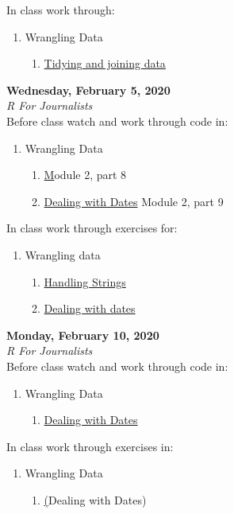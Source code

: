 \documentclass{article}
\begin{document}
\bigskip
In class work through:
\begin{enumerate}
\item Wrangling Data 
\begin{enumerate}
\item \href{http://code.r-journalism.com/chapter-3/#section-tidying-and-joining-data}{Tidying and joining data}
\end{enumerate}
\end{enumerate}
\bigskip
\textbf{Wednesday, February 5, 2020\\}
\emph{R For Journalists}\\
Before class watch and work through code in:
\begin{enumerate}
\item Wrangling Data
\begin{enumerate}
\item \href{http://learn.r-journalism.com/en/wrangling/strings/strings/} Module 2, part 8
\item \href{http://learn.r-journalism.com/en/wrangling/dates/dates/}{Dealing with Dates} Module 2, part 9
\end{enumerate}
\end{enumerate}
\bigskip
In class work through exercises for:
\begin{enumerate}
\item Wrangling data
\begin{enumerate}
\item \href{http://code.r-journalism.com/chapter-3/#section-handling-strings}{Handling Strings}
\item \href{http://code.r-journalism.com/chapter-3/#section-dealing-with-dates}{Dealing with dates}
\end{enumerate}
\end{enumerate}
\bigskip
\textbf{Monday, February 10, 2020\\}
\emph{R For Journalists}\\
Before class watch and work through code in:
\begin{enumerate}
\item Wrangling Data
\begin{enumerate}
\item \href{https://youtu.be/yt9x6PNYvlw}{Dealing with Dates}
\end{enumerate}

\end{enumerate}
\bigskip
In class work through exercises in:
\begin{enumerate}
\item Wrangling Data
\begin{enumerate}
\item \href{http://code.r-journalism.com/chapter-3/#section-dealing-with-dates}(Dealing with Dates)
\end{enumerate}
\end{enumerate}
\end{document}

